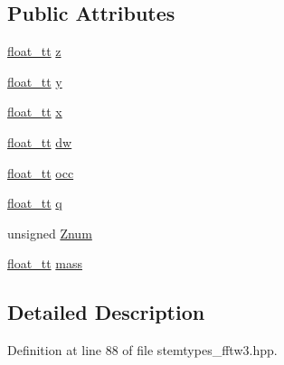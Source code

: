 \subsection*{Public Attributes}
\begin{DoxyCompactItemize}
\item 
\hyperlink{namespace_q_s_t_e_m_a915d7caa497280d9f927c4ce8d330e47}{float\-\_\-tt} \hyperlink{struct_q_s_t_e_m_1_1atom_struct_a079588e9240e40c297ec1d274b3dd80d}{z}
\item 
\hyperlink{namespace_q_s_t_e_m_a915d7caa497280d9f927c4ce8d330e47}{float\-\_\-tt} \hyperlink{struct_q_s_t_e_m_1_1atom_struct_a85ee0c4ee6a14335cdb7603a0c1d342f}{y}
\item 
\hyperlink{namespace_q_s_t_e_m_a915d7caa497280d9f927c4ce8d330e47}{float\-\_\-tt} \hyperlink{struct_q_s_t_e_m_1_1atom_struct_a317e732e7a42fe03ae1b8d3c3064ae68}{x}
\item 
\hyperlink{namespace_q_s_t_e_m_a915d7caa497280d9f927c4ce8d330e47}{float\-\_\-tt} \hyperlink{struct_q_s_t_e_m_1_1atom_struct_abfb39a697cba50d3c9f3da782fe43630}{dw}
\item 
\hyperlink{namespace_q_s_t_e_m_a915d7caa497280d9f927c4ce8d330e47}{float\-\_\-tt} \hyperlink{struct_q_s_t_e_m_1_1atom_struct_a8b71d03f3f48a5f3890fad7d7c5e978e}{occ}
\item 
\hyperlink{namespace_q_s_t_e_m_a915d7caa497280d9f927c4ce8d330e47}{float\-\_\-tt} \hyperlink{struct_q_s_t_e_m_1_1atom_struct_a545cd1fac888ef5c20245a367321ac01}{q}
\item 
unsigned \hyperlink{struct_q_s_t_e_m_1_1atom_struct_ad4ad2c76b7b9409af6f6c108d5c3e28a}{Znum}
\item 
\hyperlink{namespace_q_s_t_e_m_a915d7caa497280d9f927c4ce8d330e47}{float\-\_\-tt} \hyperlink{struct_q_s_t_e_m_1_1atom_struct_afc489a4d78aa09cfdacf554f55ad9758}{mass}
\end{DoxyCompactItemize}


\subsection{Detailed Description}


Definition at line 88 of file stemtypes\-\_\-fftw3.\-hpp.



